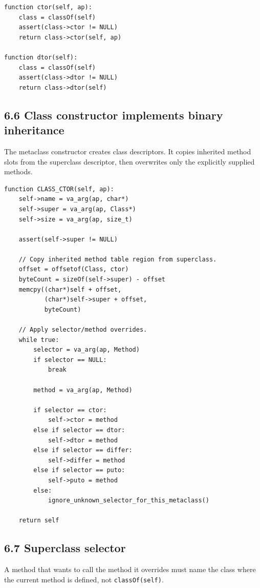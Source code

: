 \documentclass[11pt]{article}
\begin{document}
\begin{verbatim}
function ctor(self, ap):
    class = classOf(self)
    assert(class->ctor != NULL)
    return class->ctor(self, ap)

function dtor(self):
    class = classOf(self)
    assert(class->dtor != NULL)
    return class->dtor(self)
\end{verbatim}

\subsection{6.6 Class constructor implements binary
inheritance}\label{class-constructor-implements-binary-inheritance}

The metaclass constructor creates class descriptors. It copies inherited
method slots from the superclass descriptor, then overwrites only the
explicitly supplied methods.

\begin{verbatim}
function CLASS_CTOR(self, ap):
    self->name = va_arg(ap, char*)
    self->super = va_arg(ap, Class*)
    self->size = va_arg(ap, size_t)

    assert(self->super != NULL)

    // Copy inherited method table region from superclass.
    offset = offsetof(Class, ctor)
    byteCount = sizeOf(self->super) - offset
    memcpy((char*)self + offset,
           (char*)self->super + offset,
           byteCount)

    // Apply selector/method overrides.
    while true:
        selector = va_arg(ap, Method)
        if selector == NULL:
            break

        method = va_arg(ap, Method)

        if selector == ctor:
            self->ctor = method
        else if selector == dtor:
            self->dtor = method
        else if selector == differ:
            self->differ = method
        else if selector == puto:
            self->puto = method
        else:
            ignore_unknown_selector_for_this_metaclass()

    return self
\end{verbatim}

\subsection{6.7 Superclass selector}\label{superclass-selector}

A method that wants to call the method it overrides must name the class
where the current method is defined, not
\texttt{classOf(self)}.
\end{document}
